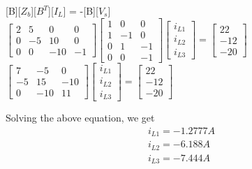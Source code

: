 \documentclass[journal,12pt,twocolumn]{IEEEtran}
\begin{document}
[B][$Z_b$][$B^T$][$I_L$] = -[B][$V_s$]\\
  $ \begin{bmatrix}
        2 & 5 & 0 & 0\\
        0 & -5 & 10 & 0\\
        0 & 0 & -10 & -1
    \end{bmatrix}
    \begin{bmatrix}
        1 & 0 & 0 \\
        1 & -1 & 0 \\
        0 & 1 & -1\\
        0 & 0 & -1
        \end{bmatrix}
 \begin{bmatrix}
i_{L1} \\ i_{L2} \\ i_{L3}
\end{bmatrix} = \begin{bmatrix}
22 \\ -12 \\ -20
\end{bmatrix}$\\
$\begin{bmatrix}
7 & -5 & 0\\
-5 & 15 & -10\\
0 & -10 & 11
\end{bmatrix}\begin{bmatrix}
i_{L1} \\ i_{L2} \\ i_{L3}
\end{bmatrix} = \begin{bmatrix}
22 \\ -12 \\ -20
\end{bmatrix}$

 Solving the above equation, we get
 \begin{align}
     i_{L1} = -1.2777 A\\
     i_{L2} = -6.188 A\\
     i_{L3} = -7.444 A
 \end{align}
\end{document}
